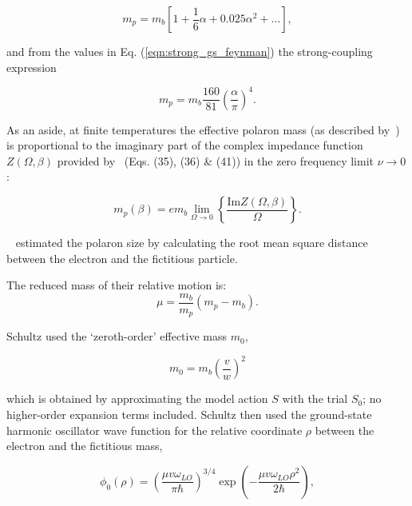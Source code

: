 \begin{equation}
    \label{eqn:weak_mass_feynman}
    m_p = m_b \left[ 1 + \frac{1}{6} \alpha + 0.025 \alpha^2 + \dots \right] ,
\end{equation}

and from the values in Eq. (\ref{eqn:strong_gs_feynman}) the strong-coupling expression

\begin{equation}
    \label{eqn:strong_mass_feynman}
    m_p = m_b \frac{160}{81} \left(\frac{\alpha}{\pi}\right)^4.
\end{equation}

As an aside, at finite temperatures the effective polaron mass (as described by~\cite{peeters_theory_1984}) is proportional to the imaginary part of the complex impedance function $Z(\Omega, \beta)$ provided by~\cite{feynman_mobility_1962} (Eqs. (35), (36) \& (41)) in the zero frequency limit $\nu \to 0$:

\begin{equation}
    m_p(\beta) =  e m_b \lim_{\Omega \to 0} \left\{ \frac{\text{Im} Z(\Omega, \beta)}{\Omega} \right\}.
\end{equation}

~\cite{schultz_slow_1959} estimated the polaron size by calculating the root mean square distance between the electron and the fictitious particle. 

The reduced mass of their relative motion is:
\begin{equation}
    \label{eqn:red_mass_schultz}
    \mu = \frac{m_b}{m_p} (m_p - m_b).
\end{equation}

Schultz used the `zeroth-order' effective mass $m_0$,

\begin{equation}
     m_0 = m_b \left(\frac{v}{w}\right)^2
\end{equation}

which is obtained by approximating the model action $S$ with the trial $S_0$; no higher-order expansion terms included. Schultz then used the ground-state harmonic oscillator wave function for the relative coordinate $\rho$ between the electron and the fictitious mass,

\begin{equation}
    \label{eqn:gs_wavefunc_schultz}
    \phi_0(\rho) = \left( \frac{\mu v \omega_{LO}}{\pi\hbar} \right)^{3/4} \exp\left( -\frac{\mu v \omega_{LO} \rho^2}{2\hbar} \right),
\end{equation}

